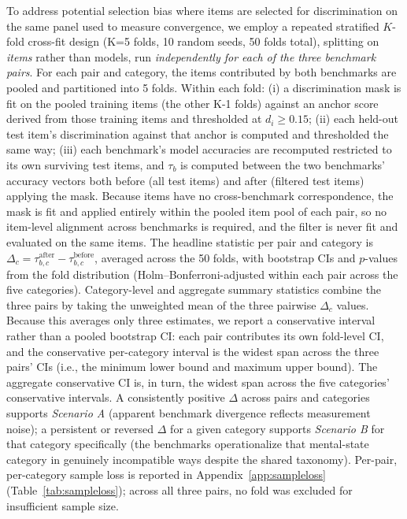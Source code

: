 \documentclass{article} %
\begin{document}
To address potential selection bias where items are selected for discrimination on the same panel used to measure convergence, we employ a repeated stratified $K$-fold cross-fit design (K=5 folds, 10 random seeds, 50 folds total), splitting on \emph{items} rather than models, run \emph{independently for each of the three benchmark pairs}. For each pair and category, the items contributed by both benchmarks are pooled and partitioned into 5 folds. Within each fold: (i) a discrimination mask is fit on the pooled training items (the other K-1 folds) against an anchor score derived from those training items and thresholded at $d_i\ge0.15$; (ii) each held-out test item's discrimination against that anchor is computed and thresholded the same way; (iii) each benchmark's model accuracies are recomputed restricted to its own surviving test items, and $\tau_b$ is computed between the two benchmarks' accuracy vectors both before (all test items) and after (filtered test items) applying the mask. Because items have no cross-benchmark correspondence, the mask is fit and applied entirely within the pooled item pool of each pair, so no item-level alignment across benchmarks is required, and the filter is never fit and evaluated on the same items. The headline statistic per pair and category is $\Delta_{c} = \tau_{b,c}^{\text{after}} - \tau_{b,c}^{\text{before}}$, averaged across the 50 folds, with bootstrap CIs and $p$-values from the fold distribution (Holm--Bonferroni-adjusted within each pair across the five categories). Category-level and aggregate summary statistics combine the three pairs by taking the unweighted mean of the three pairwise $\Delta_{c}$ values. Because this averages only three estimates, we report a conservative interval rather than a pooled bootstrap CI: each pair contributes its own fold-level CI, and the conservative per-category interval is the widest span across the three pairs' CIs (i.e., the minimum lower bound and maximum upper bound). The aggregate conservative CI is, in turn, the widest span across the five categories' conservative intervals. A consistently positive $\Delta$ across pairs and categories supports \emph{Scenario A} (apparent benchmark divergence reflects measurement noise); a persistent or reversed $\Delta$ for a given category supports \emph{Scenario B} for that category specifically (the benchmarks operationalize that mental-state category in genuinely incompatible ways despite the shared taxonomy). Per-pair, per-category sample loss is reported in Appendix~\ref{app:sampleloss} (Table~\ref{tab:sampleloss}); across all three pairs, no fold was excluded for insufficient sample size.
 
\end{document}
